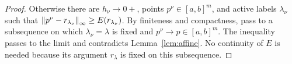 \begin{proof}
Otherwise there are $h_\nu\to0+$, points $p^\nu\in[a,b]^m$, and
active labels $\lambda_\nu$ such that
$\left\|p^\nu-r_{\lambda_\nu}\right\|_\infty\geq E(r_{\lambda_\nu})$.
By finiteness and compactness, pass to a subsequence on which
$\lambda_\nu=\lambda$ is fixed and $p^\nu\to p\in[a,b]^m$.
The inequality passes to the limit and contradicts
Lemma~\ref{lem:affine}. No continuity of $E$ is needed because its
argument $r_\lambda$ is fixed on this subsequence.
\end{proof}
